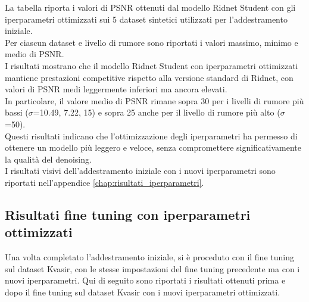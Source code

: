 \documentclass[12pt,a4paper,openright,twoside]{book}
\begin{document}
La tabella riporta i valori di PSNR ottenuti dal modello Ridnet Student con gli iperparametri ottimizzati sui 5 dataset sintetici utilizzati per l'addestramento iniziale.\\
Per ciascun dataset e livello di rumore sono riportati i valori massimo, minimo e medio di PSNR.\\
I risultati mostrano che il modello Ridnet Student con iperparametri ottimizzati mantiene prestazioni competitive rispetto alla versione standard di Ridnet, con valori di PSNR medi leggermente inferiori ma ancora elevati.\\
In particolare, il valore medio di PSNR rimane sopra 30 per i livelli di rumore più bassi ($\sigma$=10.49, 7.22, 15) e sopra 25 anche per il livello di rumore più alto ($\sigma$=50).\\
Questi risultati indicano che l'ottimizzazione degli iperparametri ha permesso di ottenere un modello più leggero e veloce, senza compromettere significativamente la qualità del denoising.\\
I risultati visivi dell'addestramento iniziale con i nuovi iperparametri sono riportati nell'appendice \autoref{chap:risultati_iperparametri}.

\subsection*{Risultati fine tuning con iperparametri ottimizzati}
Una volta completato l'addestramento iniziale, si è proceduto con il fine tuning sul dataset Kvasir, con le stesse impostazioni del fine tuning precedente ma con i nuovi iperparametri.
Qui di seguito sono riportati i risultati ottenuti prima e dopo il fine tuning sul dataset Kvasir con i nuovi iperparametri ottimizzati.
\end{document}
